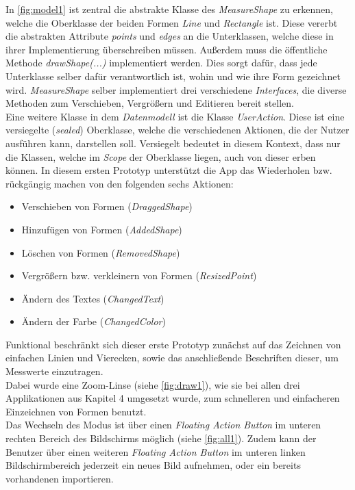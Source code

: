 \noindent
In \autoref{fig:model1} ist zentral die abstrakte Klasse des \emph{MeasureShape} zu erkennen, welche die Oberklasse der beiden Formen \emph{Line} und \emph{Rectangle} ist.
Diese vererbt die abstrakten Attribute \emph{points} und \emph{edges} an die Unterklassen, welche diese in ihrer Implementierung überschreiben müssen.
Außerdem muss die öffentliche Methode \emph{drawShape(...)} implementiert werden.
Dies sorgt dafür, dass jede Unterklasse selber dafür verantwortlich ist, wohin und wie ihre Form gezeichnet wird. 
\emph{MeasureShape} selber implementiert drei verschiedene \emph{Interfaces}, die diverse Methoden zum Verschieben, Vergrößern und Editieren bereit stellen. \\

\noindent
Eine weitere Klasse in dem \emph{Datenmodell} ist die Klasse \emph{UserAction}.
Diese ist eine versiegelte (\emph{sealed}) Oberklasse, welche die verschiedenen Aktionen, die der Nutzer ausführen kann, darstellen soll.
Versiegelt bedeutet in diesem Kontext, dass nur die Klassen, welche im \emph{Scope} der Oberklasse liegen, auch von dieser erben können.
In diesem ersten Prototyp unterstützt die App das Wiederholen bzw. rückgängig machen von den folgenden sechs Aktionen: 

\begin{itemize}
  \item Verschieben von Formen (\emph{DraggedShape})
  \item Hinzufügen von Formen (\emph{AddedShape})
  \item Löschen von Formen (\emph{RemovedShape})
  \item Vergrößern bzw. verkleinern von Formen (\emph{ResizedPoint})
  \item Ändern des Textes (\emph{ChangedText})
  \item Ändern der Farbe (\emph{ChangedColor})
\end{itemize}

\noindent
Funktional beschränkt sich dieser erste Prototyp zunächst auf das Zeichnen von einfachen Linien und Vierecken, sowie das anschließende Beschriften dieser, um Messwerte einzutragen. \\

Dabei wurde eine Zoom-Linse (siehe \autoref{fig:draw1}), wie sie bei allen drei Applikationen aus Kapitel 4 umgesetzt wurde, zum schnelleren und einfacheren Einzeichnen von Formen benutzt. \\

Das Wechseln des Modus ist über einen \emph{Floating Action Button} im unteren rechten Bereich des Bildschirms möglich (siehe \autoref{fig:all1}).
Zudem kann der Benutzer über einen weiteren \emph{Floating Action Button} im unteren linken Bildschirmbereich jederzeit ein neues Bild aufnehmen, oder ein bereits vorhandenen importieren. \\

